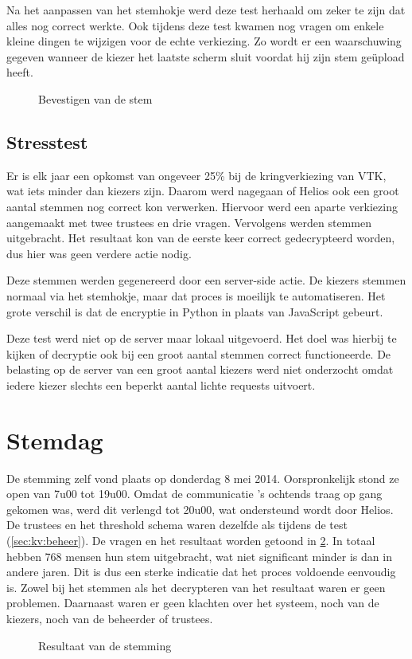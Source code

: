 \npar Na het aanpassen van het stemhokje werd deze test herhaald om zeker te zijn dat alles nog correct werkte. Ook tijdens deze test kwamen nog vragen om enkele kleine dingen te wijzigen voor de echte verkiezing. Zo wordt er een waarschuwing gegeven wanneer de kiezer het laatste scherm sluit voordat hij zijn stem ge\"upload heeft.

\begin{figure}
  \caption{Bevestigen van de stem}
  \label{fig:kv:cast_confirm}
\end{figure}

\subsection{Stresstest}

Er is elk jaar een opkomst van ongeveer 25\% bij de kringverkiezing van VTK, wat iets minder dan  kiezers zijn. Daarom werd nagegaan of Helios ook een groot aantal stemmen nog correct kon verwerken. Hiervoor werd een aparte verkiezing aangemaakt met twee trustees en drie vragen. Vervolgens werden  stemmen uitgebracht. Het resultaat kon van de eerste keer correct gedecrypteerd worden, dus hier was geen verdere actie nodig.

\npar Deze stemmen werden gegenereerd door een server-side actie. De kiezers stemmen normaal via het stemhokje, maar dat proces is moeilijk te automatiseren. Het grote verschil is dat de encryptie in Python in plaats van JavaScript gebeurt.

\npar Deze test werd niet op de server maar lokaal uitgevoerd. Het doel was hierbij te kijken of decryptie ook bij een groot aantal stemmen correct functioneerde. De belasting op de server van een groot aantal kiezers werd niet onderzocht omdat iedere kiezer slechts een beperkt aantal lichte requests uitvoert.

\section{Stemdag}
\label{sec:kv:stemdag}

\npar De stemming zelf vond plaats op donderdag 8 mei 2014. Oorspronkelijk stond ze open van 7u00 tot 19u00. Omdat de communicatie 's ochtends traag op gang gekomen was, werd dit verlengd tot 20u00, wat ondersteund wordt door Helios. De trustees en het threshold schema waren dezelfde als tijdens de test (\ref{sec:kv:beheer}). De vragen en het resultaat worden getoond in \ref{fig:kv:result}. In totaal hebben 768 mensen hun stem uitgebracht, wat niet significant minder is dan in andere jaren. Dit is dus een sterke indicatie dat het proces voldoende eenvoudig is. Zowel bij het stemmen als het decrypteren van het resultaat waren er geen problemen. Daarnaast waren er geen klachten over het systeem, noch van de kiezers, noch van de beheerder of trustees.

\begin{figure}
  \caption{Resultaat van de stemming}
  \label{fig:kv:result}
\end{figure}
